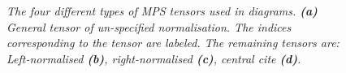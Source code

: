 \begin{figure}[h!]
\centering %
\begin{subfigure}[t]{0.2\textwidth}
	\caption{}  	
  	
\end{subfigure}
\hspace{5mm}
\begin{subfigure}[t]{0.2\textwidth}    
	\caption{}  	
  	
\end{subfigure}
\hspace{5mm}
\begin{subfigure}[t]{0.2\textwidth}    
	\caption{}  	
  	
\end{subfigure}
\hspace{5mm}
\begin{subfigure}[t]{0.2\textwidth}    
	\caption{}  	
  	
\end{subfigure}
\caption{\textit{The four different types of MPS tensors used in diagrams. \textbf{(a)} General tensor of un-specified normalisation. The indices corresponding to the tensor are labeled. The remaining tensors are: Left-normalised \textbf{(b)}, right-normalised \textbf{(c)}, central cite \textbf{(d)}. }}
\label{fig:MPStensors}
\end{figure}
	
